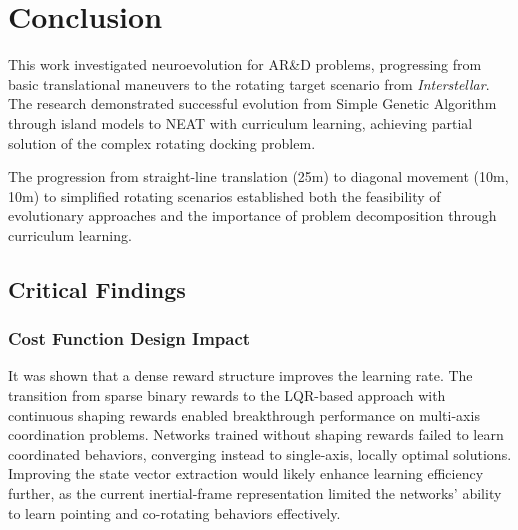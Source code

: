 \chapter{Conclusion}



% 

This work investigated neuroevolution for AR\&D problems, progressing from basic translational maneuvers to the rotating target scenario from  \textit{Interstellar}. The research demonstrated successful evolution from Simple Genetic Algorithm through island models to NEAT with curriculum learning, achieving partial solution of the complex rotating docking problem.

The progression from straight-line translation (25m) to diagonal movement (10m, 10m) to simplified rotating scenarios established both the feasibility of evolutionary approaches and the importance of problem decomposition through curriculum learning.

\section{Critical Findings}

\subsection{Cost Function Design Impact}

It was shown that a dense reward structure improves the learning rate. The transition from sparse binary rewards to the LQR-based approach with continuous shaping rewards enabled breakthrough performance on multi-axis coordination problems. Networks trained without shaping rewards failed to learn coordinated behaviors, converging instead to single-axis, locally optimal solutions.
Improving the state vector extraction would likely enhance learning efficiency further, as the current inertial-frame representation limited the networks' ability to learn pointing and co-rotating behaviors effectively.

